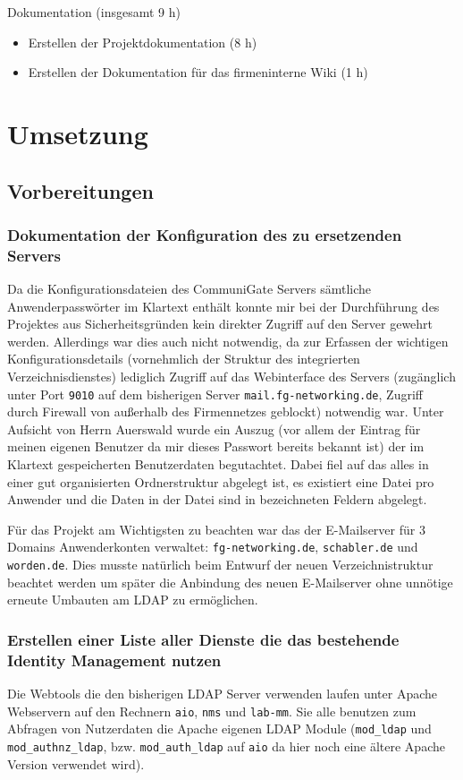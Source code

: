 \documentclass[11pt,a4paper,titlepage=firstiscover,headsepline]{scrartcl} %
\begin{document}
Dokumentation (insgesamt 9 h)
	\begin{itemize}
	\item Erstellen der Projektdokumentation (8 h)
	\item Erstellen der Dokumentation für das firmeninterne Wiki (1 h)
	\end{itemize}

\section{Umsetzung}
\subsection{Vorbereitungen}
\subsubsection{Dokumentation der Konfiguration des zu ersetzenden Servers}\label{sec:Konfig-Doku-Alt}
Da die Konfigurationsdateien des CommuniGate Servers sämtliche Anwenderpasswörter im Klartext enthält konnte mir bei der Durchführung des Projektes aus Sicherheitsgründen kein direkter Zugriff auf den Server gewehrt werden. Allerdings war dies auch nicht notwendig, da zur Erfassen der wichtigen Konfigurationsdetails (vornehmlich der Struktur des integrierten Verzeichnisdienstes) lediglich Zugriff auf das Webinterface des Servers (zugänglich unter Port \texttt{9010} auf dem bisherigen Server \texttt{mail.fg-networking.de}, Zugriff durch Firewall von außerhalb des Firmennetzes geblockt) notwendig war. Unter Aufsicht von Herrn Auerswald wurde ein Auszug (vor allem der Eintrag für meinen eigenen Benutzer da mir dieses Passwort bereits bekannt ist) der im Klartext gespeicherten Benutzerdaten begutachtet. Dabei fiel auf das alles in einer gut organisierten Ordnerstruktur abgelegt ist, es existiert eine Datei pro Anwender und die Daten in der Datei sind in bezeichneten Feldern abgelegt.

Für das Projekt am Wichtigsten zu beachten war das der E-Mailserver für 3 Domains Anwenderkonten verwaltet: \texttt{fg-networking.de}, \texttt{schabler.de} und \texttt{worden.de}. Dies musste natürlich beim Entwurf der neuen Verzeichnistruktur beachtet werden um später die Anbindung des neuen E-Mailserver ohne unnötige erneute Umbauten am LDAP zu ermöglichen.

\subsubsection{Erstellen einer Liste aller Dienste die das bestehende Identity Management nutzen}
Die Webtools die den bisherigen LDAP Server verwenden laufen unter Apache Webservern auf den Rechnern \texttt{aio}, \texttt{nms} und \texttt{lab-mm}. Sie alle benutzen zum Abfragen von Nutzerdaten die Apache eigenen LDAP Module (\texttt{mod\_ldap} und \texttt{mod\_authnz\_ldap}, bzw. \texttt{mod\_auth\_ldap} auf \texttt{aio} da hier noch eine ältere Apache Version verwendet wird). 
\end{document}
